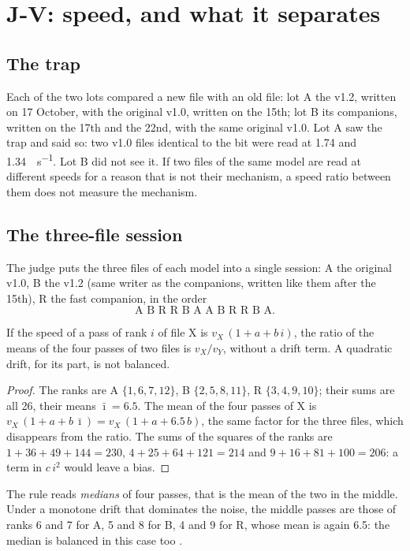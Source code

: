 \section{J-V: speed, and what it separates}\label{t3jug:sec:vitesse}

\subsection{The trap}\label{t3jug:sec:piege}

Each of the two lots compared a new file with an old file: lot A the v1.2, written on 17 October, with the original v1.0, written on the 15th; lot B its companions, written on the 17th and the 22nd, with the same original v1.0. Lot A saw the trap and said so: two v1.0 files identical to the bit were read at \num{1.74} and \SI{1.34}{\Go\per\second}. Lot B did not see it. If two files of the same model are read at different speeds for a reason that is not their mechanism, a speed ratio between them does not measure the mechanism.

\subsection{The three-file session}\label{t3jug:sec:plan}

The judge puts the three files of each model into a single session: A the original v1.0, B the v1.2 (same writer as the companions, written like them after the 15th), R the fast companion, in the order
\[
\text{A B R R B A A B R R B A} .
\]

\begin{proposition}\label{t3jug:prop:plan}
If the speed of a pass of rank $i$ of file X is $v_X\,(1 + a + b\,i)$, the ratio of the means of the four passes of two files is $v_X / v_Y$, without a drift term. A quadratic drift, for its part, is not balanced.
\end{proposition}
\begin{proof}
The ranks are A $\{1, 6, 7, 12\}$, B $\{2, 5, 8, 11\}$, R $\{3, 4, 9, 10\}$; their sums are all 26, their means $\bar\imath = \num{6.5}$. The mean of the four passes of X is $v_X\,(1 + a + b\,\bar\imath) = v_X\,(1 + a + 6.5\,b)$, the same factor for the three files, which disappears from the ratio. The sums of the squares of the ranks are $1 + 36 + 49 + 144 = 230$, $4 + 25 + 64 + 121 = 214$ and $9 + 16 + 81 + 100 = 206$: a term in $c\,i^2$ would leave a bias.
\end{proof}
The rule reads \emph{medians} of four passes, that is the mean of the two in the middle. Under a monotone drift that dominates the noise, the middle passes are those of ranks 6 and 7 for A, 5 and 8 for B, 4 and 9 for R, whose mean is again \num{6.5}: the median is balanced in this case too \calc.

